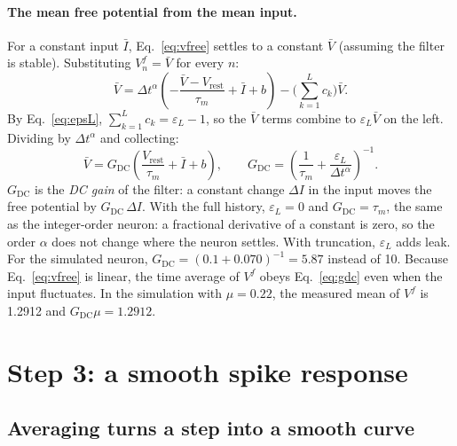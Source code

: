 \documentclass[11pt,a4paper]{article}
\newcommand{\Vrest}{V_{\mathrm{rest}}}
\newcommand{\GDC}{G_{\mathrm{DC}}}
\begin{document}
\paragraph{The mean free potential from the mean input.} For a constant input $\bar I$, Eq.~\eqref{eq:vfree} settles to a constant $\bar V$ (assuming the filter is stable). Substituting $V^f_n = \bar V$ for every $n$:
\begin{equation*}
\bar V = \Delta t^{\alpha}\left( -\frac{\bar V - \Vrest}{\tau_m} + \bar I + b \right) - \Big( \sum_{k=1}^{L} c_k \Big) \bar V.
\end{equation*}
By Eq.~\eqref{eq:epsL}, $\sum_{k=1}^{L} c_k = \varepsilon_L - 1$, so the $\bar V$ terms combine to $\varepsilon_L \bar V$ on the left. Dividing by $\Delta t^{\alpha}$ and collecting:
\begin{equation}
\bar V = \GDC \left( \frac{\Vrest}{\tau_m} + \bar I + b \right), \qquad \GDC = \left( \frac{1}{\tau_m} + \frac{\varepsilon_L}{\Delta t^{\alpha}} \right)^{-1}.
\label{eq:gdc}
\end{equation}
$\GDC$ is the \emph{DC gain} of the filter: a constant change $\Delta I$ in the input moves the free potential by $\GDC\,\Delta I$. With the full history, $\varepsilon_L = 0$ and $\GDC = \tau_m$, the same as the integer-order neuron: a fractional derivative of a constant is zero, so the order $\alpha$ does not change where the neuron settles. With truncation, $\varepsilon_L$ adds leak. For the simulated neuron, $\GDC = (0.1 + 0.070)^{-1} = 5.87$ instead of 10. Because Eq.~\eqref{eq:vfree} is linear, the time average of $V^f$ obeys Eq.~\eqref{eq:gdc} even when the input fluctuates. In the simulation with $\mu = 0.22$, the measured mean of $V^f$ is 1.2912 and $\GDC \mu = 1.2912$.

\section{Step 3: a smooth spike response}
\label{sec:smooth}

\subsection{Averaging turns a step into a smooth curve}
\end{document}

